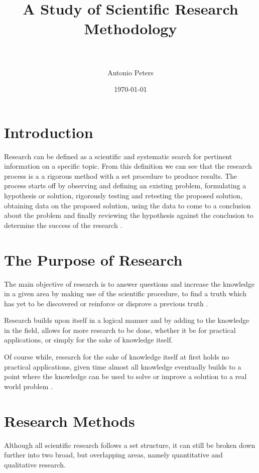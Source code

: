 \documentclass[paper=a4, fontsize=11pt]{scrartcl} %
\title{	
A Study of Scientific Research Methodology \\ %
\horrule{2pt} \\[0.5cm] %
}
\author{Antonio Peters} %
\date{\normalsize\today} %
\begin{document}
\maketitle %

\section{Introduction}

Research can be defined as a scientific and systematic search for pertinent information on a specific topic. From this definition we can see that the research process is a a rigorous method with a set procedure to produce results. The process starts off by observing and defining an existing problem, formulating a hypothesis or solution, rigorously testing and retesting the proposed solution, obtaining data on the proposed solution, using the data to come to a conclusion about the problem and finally reviewing the hypothesis against the conclusion to determine the success of the research \cite{kothari2004research}. 

\section{The Purpose of Research}

The main objective of research is to answer questions and increase the knowledge in a given area by making use of the scientific procedure, to find a truth which has yet to be discovered or reinforce or disprove a previous truth \cite{kothari2004research}. 

Research builds upon itself in a logical manner and by adding to the knowledge in the field, allows for more research to be done, whether it be for practical applications, or simply for the sake of knowledge itself.

Of course while, research for the sake of knowledge itself at first holds no practical applications, given time almost all knowledge eventually builds to a point where the knowledge can be used to solve or improve a solution to a real world problem \cite{kothari2004research}.

\pagebreak

\section{Research Methods}

Although all scientific research follows a set structure, it can still be broken down further into two broad, but overlapping areas, namely quantitative and qualitative research. 
\end{document}
